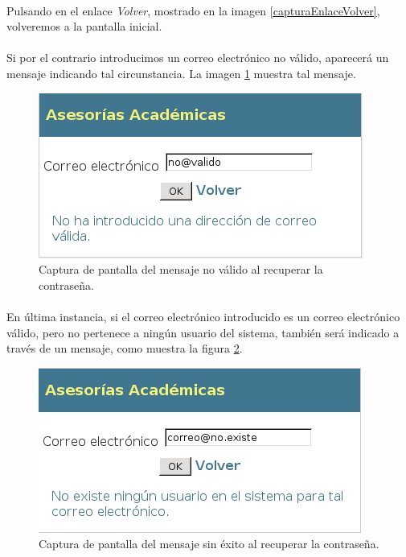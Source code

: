   \paragraph{}Pulsando en el enlace \textit{Volver}, mostrado en la imagen
  \ref{capturaEnlaceVolver}, volveremos a la pantalla inicial.

  \paragraph{}Si por el contrario introducimos un correo electrónico no válido,
  aparecerá un mensaje indicando tal circunstancia. La imagen
  \ref{capturaPedirCorreoInvalido} muestra tal mensaje.

  \begin{figure}[!ht]
    \begin{center}
      \includegraphics[]{4.Funcionamiento_Aplicacion/4.2.Acceso_Sistema/4.2.1.Recordar_Password/Capturas/pedir_correo_invalido.png}
      \caption{Captura de pantalla del mensaje no válido al recuperar la contraseña.}
      \label{capturaPedirCorreoInvalido}
    \end{center}
  \end{figure}

  \paragraph{}En última instancia, si el correo electrónico introducido es un
  correo electrónico válido, pero no pertenece a ningún usuario del sistema,
  también será indicado a través de un mensaje, como muestra la figura
  \ref{capturaPedirCorreoNoExito}.

  \begin{figure}[!ht]
    \begin{center}
      \includegraphics[]{4.Funcionamiento_Aplicacion/4.2.Acceso_Sistema/4.2.1.Recordar_Password/Capturas/pedir_correo_noexito.png}
      \caption{Captura de pantalla del mensaje sin éxito al recuperar la contraseña.}
      \label{capturaPedirCorreoNoExito}
    \end{center}
  \end{figure}
